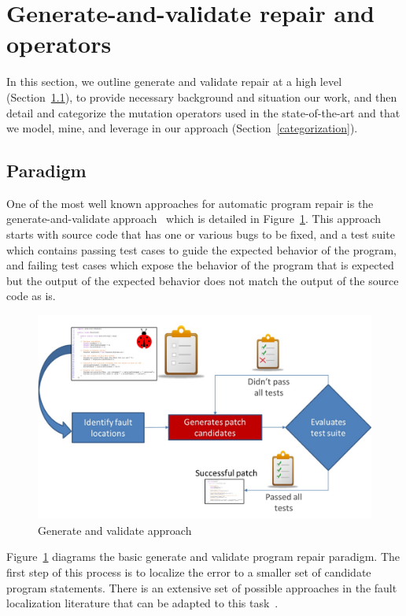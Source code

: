 \documentclass[conference]{IEEEtran}
\begin{document}
\section{Generate-and-validate repair and operators} 
\label{background}

In this section, we outline generate and validate repair at a high level
(Section~\ref{sec-paradigm}), to provide necessary background and situation our
work, and then detail and categorize the mutation operators used in the
state-of-the-art and that we model, mine, and leverage in our approach
(Section~\ref{categorization}).  
 
 
\subsection{Paradigm}
\label{sec-paradigm}


One of the most well known approaches for automatic program repair is the
generate-and-validate approach~\cite{legoues12} which is detailed in Figure~\ref{fig:generateandvalidate}. This approach starts with source code that
has one or various bugs to be fixed, and a test suite which contains passing
test cases to guide the expected behavior of the program, and failing test 
cases which expose the behavior of the program that is expected but the output
of the expected behavior does not match the output of the source code as is.

\begin{figure}[!h]
  \centering
    \includegraphics[scale=0.25]{Picture1}
  \caption{Generate and validate approach}
  \label{fig:generateandvalidate}
\end{figure}

Figure~\ref{fig:generateandvalidate} diagrams the basic generate and validate
program repair paradigm. The first step of this process is to localize the error to a smaller set of
candidate program statements. There is an extensive set of possible approaches
in the fault localization literature that can be adapted to this
task~\cite{Jones05,Jones02,Chen02,Qi2013}.  
\end{document}
